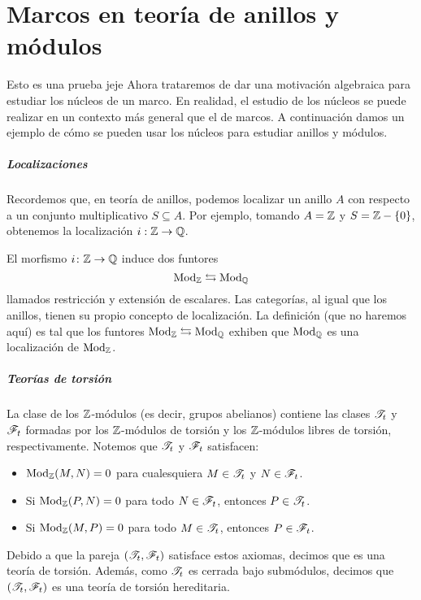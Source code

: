 \chapter{Marcos en teoría de anillos y módulos}
Esto es una prueba jeje
Ahora trataremos de dar una motivación algebraica para
estudiar los núcleos de un marco.
En realidad, el estudio de los núcleos se puede realizar
en un contexto más general que el de marcos.
A continuación damos un ejemplo de cómo se pueden usar
los núcleos para estudiar anillos y módulos.

\paragraph{Localizaciones}
Recordemos que, en teoría de anillos,
podemos localizar un anillo $A$ con respecto a un conjunto
multiplicativo $S\subseteq A$.
Por ejemplo, tomando $A=\mathbb Z$ y $S=\mathbb Z-\{0\}$,
obtenemos la localización $i:\mathbb Z\to\mathbb Q$.

El morfismo $i\colon\mathbb Z\to\mathbb Q$ induce dos funtores
\[
    \mathrm{Mod}_\mathbb Z\leftrightarrows\mathrm{Mod}_\mathbb Q
\]
llamados restricción y extensión de escalares.
Las categorías, al igual que los anillos,
tienen su propio concepto de localización.
La definición (que no haremos aquí) es tal que
los funtores $\mathrm{Mod}_\mathbb Z\leftrightarrows\mathrm{Mod}_\mathbb Q$
exhiben que $\mathrm{Mod}_\mathbb Q$ es una localización de $\mathrm{Mod}_\mathbb Z$.

\paragraph{Teorías de torsión}
La clase de los $\mathbb Z$-módulos (es decir, grupos abelianos)
contiene las clases $\mathscr{T}_t$ y $\mathscr{F}_t$
formadas por los $\mathbb Z$-módulos de torsión y los $\mathbb Z$-módulos
libres de torsión, respectivamente.
Notemos que $\mathscr{T}_t$ y $\mathscr{F}_t$ satisfacen:
\begin{itemize}
    \item
    $\mathrm{Mod}_\mathbb Z(M,N)=0$ para cualesquiera $M\in\mathscr{T}_t$
    y $N\in\mathscr{F}_t$.
    \item
    Si $\mathrm{Mod}_\mathbb Z(P,N)=0$ para todo $N\in\mathscr{F}_t$,
    entonces $P\in\mathscr{T}_t$.
    \item
    Si $\mathrm{Mod}_\mathbb Z(M,P)=0$ para todo $M\in\mathscr{T}_t$,
    entonces $P\in\mathscr{F}_t$.
\end{itemize}
Debido a que la pareja $(\mathscr{T}_t,\mathscr{F}_t)$ satisface estos
axiomas, decimos que es una teoría de torsión.
Además, como $\mathscr{T}_t$ es cerrada bajo submódulos,
decimos que $(\mathscr{T}_t,\mathscr{F}_t)$ es una teoría de torsión hereditaria.

